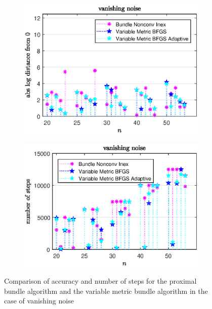 \vspace{-1.5em}

\begin{figure}[H]
	\begin{subfigure}{0.49\textwidth}
		\includegraphics[width=\textwidth]{Pictures/Plots/vanishing_noise_b.eps}%
	\end{subfigure}
	\begin{subfigure}{0.49\textwidth}
		\includegraphics[width=\textwidth]{Pictures/Plots/steps_vanishing_noise_b.eps}%
	\end{subfigure}
	\caption[Accuracy and number of steps: vanishing noise, higher dimensions]{Comparison of accuracy and number of steps for the proximal bundle algorithm and the variable metric bundle algorithm in the case of vanishing noise}%
	\label{fig_van_noise_large}%
\end{figure}

